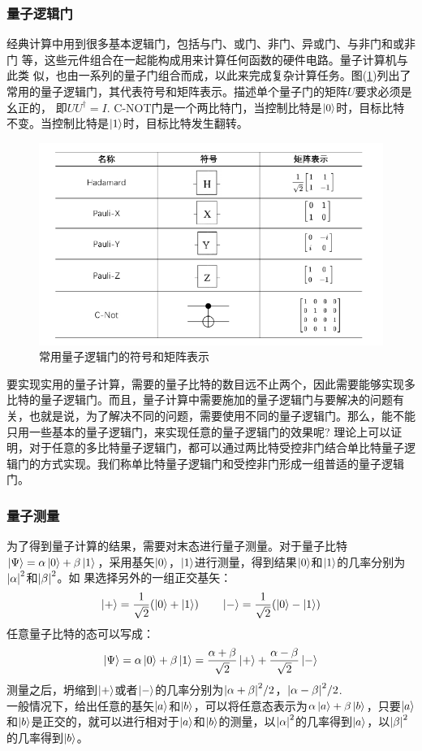 \documentclass[a4paper]{article}
\begin{document}
\subsubsection{量子逻辑门}
经典计算中用到很多基本逻辑门，包括与门、或门、非门、异或门、与非门和或非门
等，这些元件组合在一起能构成用来计算任何函数的硬件电路。量子计算机与此类
似，也由一系列的量子门组合而成，以此来完成复杂计算任务。图(\ref{fig:gate})列出了常用的量子逻辑门，其代表符号和矩阵表示。描述单个量子门的矩阵$ U $要求必须是幺正的，
即$ U U^\dagger = I $. C-NOT门是一个两比特门，当控制比特是$ \ket{0} $时，目标比特不变。当控制比特是$ \ket{1} $时，目标比特发生翻转。\\
\begin{figure}[H]
	\centering
	\includegraphics[width=0.8\linewidth]{fig/2.jpg}
	\caption{常用量子逻辑门的符号和矩阵表示}
	\label{fig:gate}
\end{figure}
要实现实用的量子计算，需要的量子比特的数目远不止两个，因此需要能够实现多比特的量子逻辑门。而且，量子计算中需要施加的量子逻辑门与要解决的问题有关，也就是说，为了解决不同的问题，需要使用不同的量子逻辑门。那么，能不能只用一些基本的量子逻辑门，来实现任意的量子逻辑门的效果呢? 理论上可以证明，对于任意的多比特量子逻辑门，都可以通过两比特受控非门结合单比特量子逻辑门的方式实现。我们称单比特量子逻辑门和受控非门形成一组普适的量子逻辑门。

\subsubsection{量子测量}
为了得到量子计算的结果，需要对末态进行量子测量。对于量子比特$ \ket{\Psi} = \alpha\ket{0} + \beta\ket{1} $，采用基矢$ \ket{0} $，$ \ket{1} $进行测量，得到结果$ \ket{0} $和$ \ket{1} $的几率分别为$ \abs{\alpha}^2 $和$ \abs{\beta}^2 $。如
果选择另外的一组正交基矢：
\begin{equation}\label{key}
\ket{+} = \dfrac{1}{\sqrt{2}}(\ket{0} + \ket{1})  \qquad \ket{-} = \dfrac{1}{\sqrt{2}}(\ket{0} - \ket{1})
\end{equation}
任意量子比特的态可以写成：
\begin{equation}\label{key}
\ket{\Psi} = \alpha\ket{0} + \beta\ket{1} = \dfrac{\alpha+\beta}{\sqrt{2}}\ket{+} + \dfrac{\alpha-\beta}{\sqrt{2}}\ket{-}
\end{equation}
测量之后，坍缩到$ \ket{+} $或者$ \ket{-} $的几率分别为$ \abs{\alpha+\beta}^2/2 $，$ \abs{\alpha-\beta}^2/2 $.\\
一般情况下，给出任意的基矢$ \ket{a} $和$ \ket{b} $，可以将任意态表示为$ \alpha\ket{a}+ \beta\ket{b} $，只要$ \ket{a} $和$ \ket{b} $是正交的，就可以进行相对于$ \ket{a} $和$ \ket{b} $的测量，以$ \abs{\alpha}^2 $的几率得到$ \ket{a} $，以$ \abs{\beta}^2 $的几率得到$ \ket{b} $。
\end{document}
